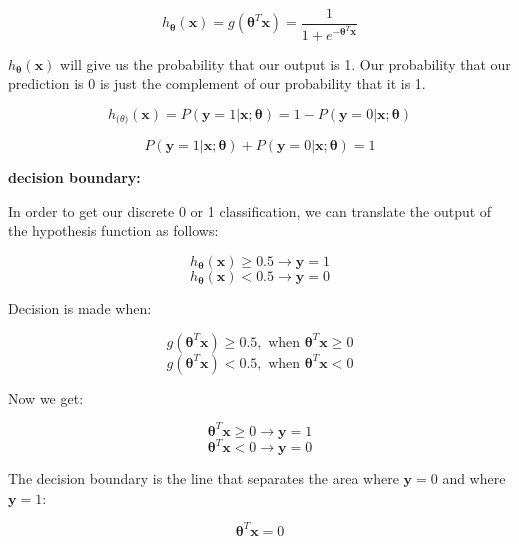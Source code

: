\documentclass{article}
\begin{document}
\[
h_{\boldsymbol{\theta}}(\textbf{x}) 
= g(\boldsymbol{\theta}^T \textbf{x})
= \frac{1}{1 + e^{-\boldsymbol{\theta}^T \textbf{x}}}
\]

\noindent \(h_{\boldsymbol{\theta}}(\textbf{x})\) will give us the probability that our output is 1. Our probability that our prediction is 0 is just the complement of our probability that it is 1.

\[
h_{\boldsymbol(\theta)} (\textbf{x}) 
= P(\textbf{y} = 1 | \textbf{x} ; \boldsymbol{\theta})
= 1 - P(\textbf{y} = 0 | \textbf{x} ; \boldsymbol{\theta})
\]

\[P(\textbf{y} = 1 | \textbf{x} ; \boldsymbol{\theta}) + P(\textbf{y} = 0 | \textbf{x} ; \boldsymbol{\theta}) = 1\]

\noindent \textbf{decision boundary:}

\noindent In order to get our discrete 0 or 1 classification, we can translate the output of the hypothesis function as follows:

\[h_{\boldsymbol{\theta}} (\textbf{x}) \geq 0.5 \rightarrow \textbf{y} = 1\]
\[h_{\boldsymbol{\theta}} (\textbf{x}) < 0.5 \rightarrow \textbf{y} = 0\]

\noindent Decision is made when:

\[g(\boldsymbol{\theta}^T \textbf{x}) \geq 0.5, \text{ when } \boldsymbol{\theta}^T \textbf{x} \geq 0\]
\[g(\boldsymbol{\theta}^T \textbf{x}) < 0.5, \text{ when } \boldsymbol{\theta}^T \textbf{x} < 0\]

\noindent Now we get:

\[\boldsymbol{\theta}^T \textbf{x} \geq 0 \rightarrow \textbf{y} = 1\]
\[\boldsymbol{\theta}^T \textbf{x} < 0 \rightarrow \textbf{y} = 0\]

\noindent The decision boundary is the line that separates the area where \(\textbf{y} = 0\) and where \(\textbf{y} = 1\):

\[\boldsymbol{\theta}^T \textbf{x} = 0\]

\printindex
\end{document}
